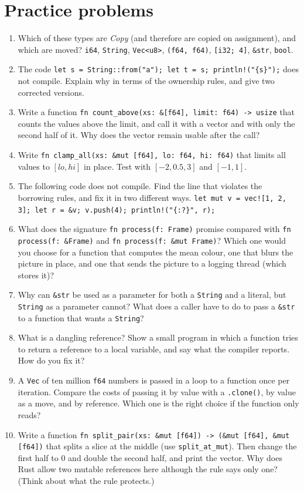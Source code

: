 \section*{Practice problems}
\begin{enumerate}[label=\textbf{\thechapter.\arabic*}]
  \item Which of these types are \emph{Copy} (and therefore are copied on assignment), and which are moved? \verb!i64!, \verb!String!, \verb!Vec<u8>!, \verb!(f64, f64)!, \verb![i32; 4]!, \verb!&str!, \verb!bool!.
  \item The code \verb|let s = String::from("a"); let t = s; println!("{s}");| does not compile. Explain why in terms of the ownership rules, and give two corrected versions.
  \item Write a function \verb!fn count_above(xs: &[f64], limit: f64) -> usize! that counts the values above the limit, and call it with a vector and with only the second half of it. Why does the vector remain usable after the call?
  \item Write \verb!fn clamp_all(xs: &mut [f64], lo: f64, hi: f64)! that limits all values to $[lo,hi]$ in place. Test with $[-2,0.5,3]$ and $[-1,1]$.
  \item The following code does not compile. Find the line that violates the borrowing rules, and fix it in two different ways. \verb|let mut v = vec![1, 2, 3]; let r = &v; v.push(4); println!("{:?}", r);|
  \item What does the signature \verb!fn process(f: Frame)! promise compared with \verb!fn process(f: &Frame)! and \verb!fn process(f: &mut Frame)!? Which one would you choose for a function that computes the mean colour, one that blurs the picture in place, and one that sends the picture to a logging thread (which stores it)?
  \item Why can \verb!&str! be used as a parameter for both a \verb!String! and a literal, but \verb!String! as a parameter cannot? What does a caller have to do to pass a \verb!&str! to a function that wants a \verb!String!?
  \item What is a dangling reference? Show a small program in which a function tries to return a reference to a local variable, and say what the compiler reports. How do you fix it?
  \item A \verb!Vec! of ten million \verb!f64! numbers is passed in a loop to a function once per iteration. Compare the costs of passing it by value with a \verb!.clone()!, by value as a move, and by reference. Which one is the right choice if the function only reads?
  \item[\textbf{\thechapter.10}$\star$] Write a function \verb!fn split_pair(xs: &mut [f64]) -> (&mut [f64], &mut [f64])! that splits a slice at the middle (use \verb!split_at_mut!). Then change the first half to $0$ and double the second half, and print the vector. Why does Rust allow two mutable references here although the rule says only one? (Think about what the rule protects.)
\end{enumerate}
